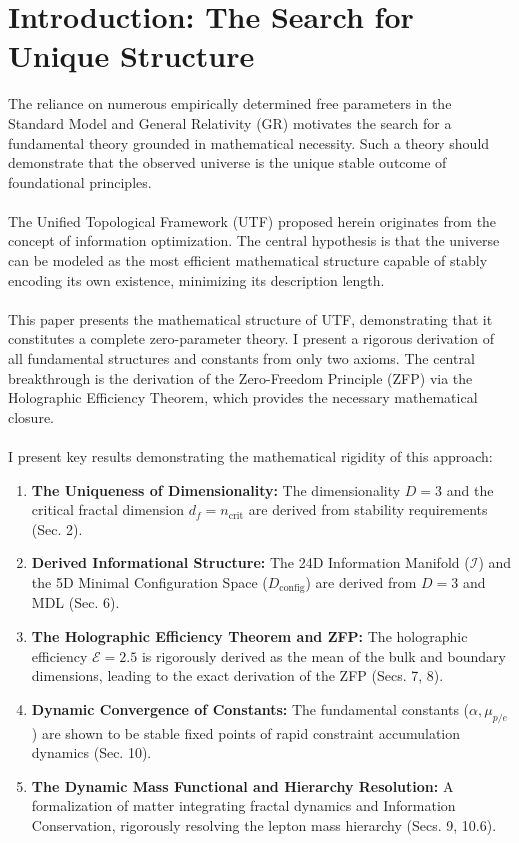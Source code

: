 \documentclass[11pt, a4paper]{article}
\theoremstyle{definition}
\theoremstyle{definition}
\newcommand{\Ical}{\mathcal{I}}
\newcommand{\df}{d_f} %
\newcommand{\ncrit}{n_{\mathrm{crit}}}
\newcommand{\Ecal}{\mathcal{E}} %
\newcommand{\Dconfig}{D_{\mathrm{config}}}
\begin{document}
\tableofcontents
\newpage

\section{Introduction: The Search for Unique Structure}

The reliance on numerous empirically determined free parameters in the Standard Model and General Relativity (GR) motivates the search for a fundamental theory grounded in mathematical necessity. Such a theory should demonstrate that the observed universe is the unique stable outcome of foundational principles.\\
\\
The Unified Topological Framework (UTF) proposed herein originates from the concept of information optimization. The central hypothesis is that the universe can be modeled as the most efficient mathematical structure capable of stably encoding its own existence, minimizing its description length.\\
\\
This paper presents the mathematical structure of UTF, demonstrating that it constitutes a complete zero-parameter theory. I present a rigorous derivation of all fundamental structures and constants from only two axioms. The central breakthrough is the derivation of the Zero-Freedom Principle (ZFP) via the Holographic Efficiency Theorem, which provides the necessary mathematical closure.
\\
\\
I present key results demonstrating the mathematical rigidity of this approach:\\
\begin{enumerate}
    \item \textbf{The Uniqueness of Dimensionality:} The dimensionality $D=3$ and the critical fractal dimension $\df=\ncrit$ are derived from stability requirements (Sec. 2).
    \item \textbf{Derived Informational Structure:} The 24D Information Manifold ($\Ical$) and the 5D Minimal Configuration Space ($\Dconfig$) are derived from $D=3$ and MDL (Sec. 6).
    \item \textbf{The Holographic Efficiency Theorem and ZFP:} The holographic efficiency $\Ecal=2.5$ is rigorously derived as the mean of the bulk and boundary dimensions, leading to the exact derivation of the ZFP (Secs. 7, 8).
    \item \textbf{Dynamic Convergence of Constants:} The fundamental constants ($\alpha, \mu_{p/e}$) are shown to be stable fixed points of rapid constraint accumulation dynamics (Sec. 10).
    \item \textbf{The Dynamic Mass Functional and Hierarchy Resolution:} A formalization of matter integrating fractal dynamics and Information Conservation, rigorously resolving the lepton mass hierarchy (Secs. 9, 10.6).
\end{enumerate}
\end{document}
